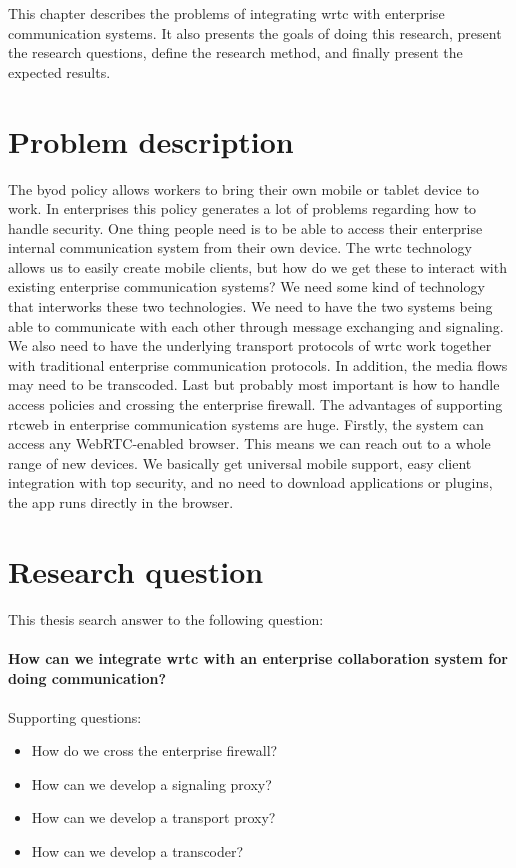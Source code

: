 
This chapter describes the problems of integrating \gls{wrtc} with enterprise communication systems. It also presents the goals of doing this research, present the research questions, define the research method, and finally present the expected results.

\section{Problem description}
The \gls{byod} policy allows workers to bring their own mobile or tablet device to work. In enterprises this policy generates a lot of problems regarding how to handle security. One thing people need is to be able to access their enterprise internal communication system from their own device. The \gls{wrtc} technology allows us to easily create mobile clients, but how do we get these to interact with existing enterprise communication systems? We need some kind of technology that interworks these two technologies. We need to have the two systems being able to communicate with each other through message exchanging and signaling. We also need to have the underlying transport protocols of \gls{wrtc} work together with traditional enterprise communication protocols. In addition, the media flows may need to be transcoded. Last but probably most important is how to handle access policies and crossing the enterprise firewall. The advantages of supporting \gls{rtcweb} in enterprise communication systems are huge. Firstly, the system can access any WebRTC-enabled browser. This means we can reach out to a whole range of new devices. We basically get universal mobile support, easy client integration with top security, and no need to download applications or plugins, the app runs directly in the browser.

\section{Research question}
This thesis search answer to the following question:
\\
\\
\textbf{How can we integrate \gls{wrtc} with an enterprise collaboration system for doing communication?}
\\
\\
Supporting questions:

\begin{itemize}
\item How do we cross the enterprise firewall?
\item How can we develop a signaling proxy?
\item How can we develop a transport proxy?
\item How can we develop a transcoder?
\end{itemize}

